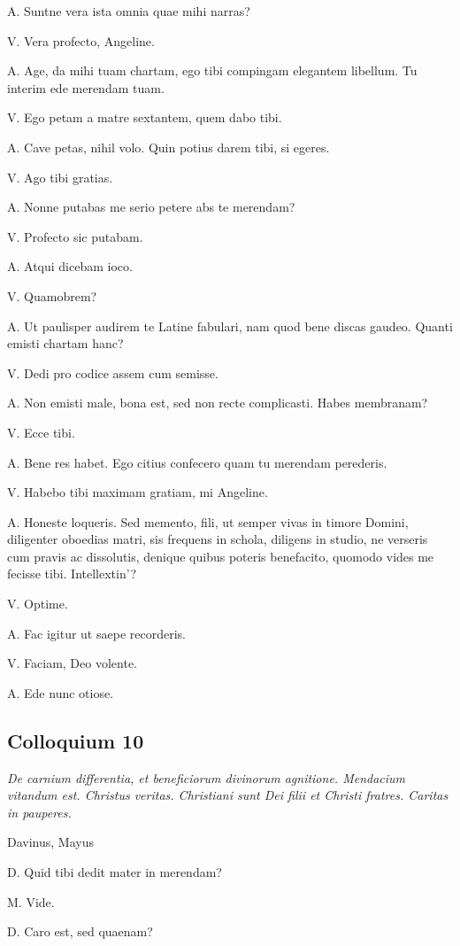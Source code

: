 \documentclass{article}
\begin{document}
A. Suntne vera ista omnia quae mihi narras?

V. Vera profecto, Angeline. 

A. Age, da mihi tuam chartam, ego tibi compingam elegantem libellum. Tu interim ede merendam tuam. 

V. Ego petam a matre sextantem, quem dabo tibi. 

A. Cave petas, nihil volo. Quin potius darem tibi, si egeres.

V. Ago tibi gratias. 

A. Nonne putabas me serio petere abs te merendam?

V. Profecto sic putabam. 

A. Atqui dicebam ioco. 

V. Quamobrem?

A. Ut paulisper audirem te Latine fabulari, nam quod bene discas gaudeo. Quanti emisti chartam hanc?

V. Dedi pro codice assem cum semisse. 

A. Non emisti male, bona est, sed non recte complicasti. Habes membranam?

V. Ecce tibi. 

A. Bene res habet. Ego citius confecero quam tu merendam perederis. 

V. Habebo tibi maximam gratiam, mi Angeline. 

A. Honeste loqueris. Sed memento, fili, ut semper vivas in timore Domini, diligenter oboedias matri, sis frequens in schola, diligens in studio, ne verseris cum pravis ac dissolutis, denique quibus poteris benefacito, quomodo vides me fecisse tibi. Intellextin’?

V. Optime. 

A. Fac igitur ut saepe recorderis. 

V. Faciam, Deo volente. 

A. Ede nunc otiose. 

\subsection{Colloquium 10}
\emph{De carnium differentia, et beneficiorum divinorum agnitione. Mendacium vitandum est. Christus veritas. Christiani sunt Dei filii et Christi fratres. Caritas in pauperes.}

Davinus, Mayus

D. Quid tibi dedit mater in merendam?

M. Vide. 

D. Caro est, sed quaenam?
\end{document}
